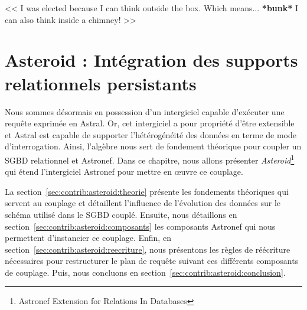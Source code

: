\begin{savequote}[6cm]
<< I was elected because I can think outside the box. 
Which means... \textbf{*bunk*} I can also think inside a chimney! >>
\end{savequote}

\chapter{Asteroid : Intégration des supports relationnels persistants}\label{chap:contrib:asteroid}
\chaptertoc

Nous sommes désormais en possession d'un intergiciel capable d'exécuter une requête exprimée en Astral. Or, cet intergiciel a pour propriété d'être extensible et Astral est capable de supporter l'hétérogénéité des données en terme de mode d'interrogation. Ainsi, l'algèbre nous sert de fondement théorique pour coupler un SGBD relationnel et Astronef. Dans ce chapitre, nous allons présenter \textit{Asteroid}\footnote{Astronef Extension for Relations In Databases} qui étend l'intergiciel Astronef pour mettre en œuvre ce couplage.

La section~\ref{sec:contrib:asteroid:theorie} présente les fondements théoriques qui servent au couplage et détaillent l'influence de l'évolution des données sur le schéma utilisé dans le SGBD couplé. Ensuite, nous détaillons en section~\ref{sec:contrib:asteroid:composants} les composants Astronef qui nous permettent d'instancier ce couplage. Enfin, en section~\ref{sec:contrib:asteroid:reecriture}, nous présentons les règles de réécriture nécessaires pour restructurer le plan de requête suivant ces différents composants de couplage. Puis, nous concluons en section~\ref{sec:contrib:asteroid:conclusion}.






